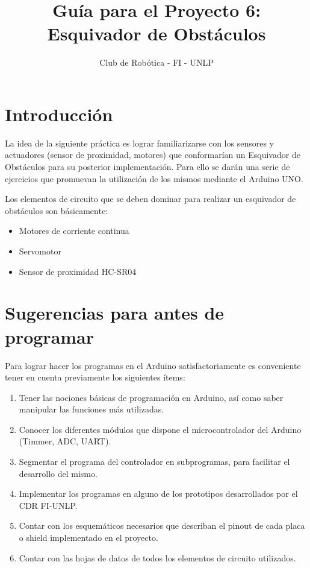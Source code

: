 \documentclass[a4paper,11pt]{article}
\title{\Huge{\textbf{Guía para el Proyecto 6: Esquivador de Obstáculos}}}
\author{Club de Robótica - FI - UNLP}
\date{}
\begin{document}
\maketitle

\section{Introducción}

La idea de la siguiente práctica es lograr familiarizarse con los sensores y actuadores (sensor de proximidad, motores) que conformarían un Esquivador de Obstáculos para su posterior implementación. Para ello se darán una serie de ejercicios que promuevan la utilización de los mismos mediante el Arduino UNO.

Los elementos de circuito que se deben dominar para realizar un esquivador de obstáculos son básicamente:

\begin{itemize}
	\item Motores de corriente continua 
	\item Servomotor
	\item Sensor de proximidad HC-SR04
\end{itemize}
 


\section{Sugerencias para antes de programar}

Para lograr hacer los programas en el Arduino satisfactoriamente es conveniente tener en cuenta previamente los siguientes ítems:

\begin{enumerate}
	\item Tener las nociones básicas de programación en Arduino, así como saber manipular las funciones más utilizadas.	
	\item Conocer los diferentes módulos que dispone el microcontrolador del Arduino (Timmer, ADC, UART).
	\item Segmentar el programa del controlador en subprogramas, para facilitar el desarrollo del mismo.
	\item Implementar los programas en alguno de los prototipos desarrollados por el CDR FI-UNLP.
	\item Contar con los esquemáticos necesarios que describan el pinout de cada placa o shield implementado en el proyecto.
	\item Contar con las hojas de datos de todos los elementos de circuito utilizados.
\end{enumerate}
 
\end{document}
